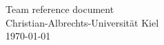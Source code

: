 \documentclass{article}
\begin{document}
\begin{titlepage}
	\centering
	\large
	\vspace*{\fill}
	\vspace{0.5\baselineskip}
	Team reference document\\
	\vspace{2.5\baselineskip}
	Christian-Albrechts-Universität Kiel \\
	\vspace{2\baselineskip}
	\today \\
	\vspace*{\fill}
\end{titlepage}
      
\begin{multicols*}{2}
  \lstset{language=[11]c++}
  

  \blindtext[3]
\end{multicols*}
\end{document}
